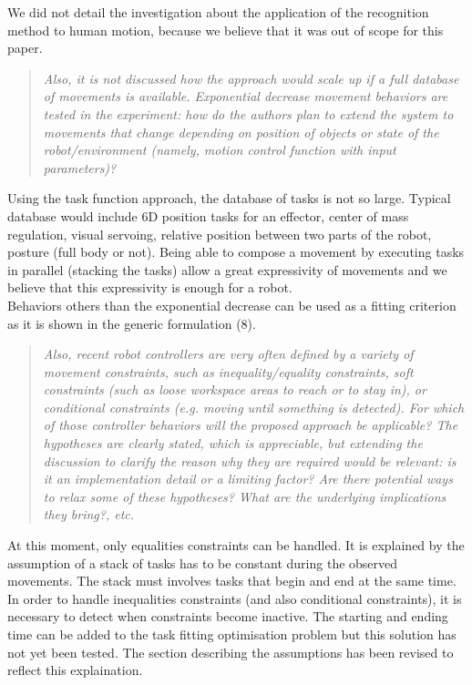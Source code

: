 \documentclass[11pt]{article}
\begin{document}
We did not detail the investigation about the application of the recognition
method to human motion, because we believe that
it was out of scope for this paper.

\begin{quote}
\textit{
Also, it is not discussed how the approach would scale up if a full database of movements is available. Exponential decrease movement behaviors are tested in the experiment: how do the authors plan to extend the system to movements that change depending on position of objects or state of the robot/environment (namely, motion control function with input parameters)?
}
\end{quote}
Using the task function approach,
the database of tasks is not so large. Typical database would include
6D position tasks for an effector, center of mass regulation, 
   visual servoing, relative position between two parts of the robot, 
   posture (full body or not).
  Being able to compose a movement by executing tasks in parallel (stacking the tasks)
  allow a great expressivity of movements and we believe that this expressivity
  is enough for a robot. \\

  Behaviors others than the exponential decrease can be
  used as a fitting criterion as it is shown in the generic formulation (8).

\begin{quote}
\textit{
  Also, recent robot controllers are very often defined by a variety of movement constraints, such as inequality/equality constraints, soft constraints (such as loose workspace areas to reach or to stay in), or conditional constraints (e.g. moving until something is detected). For which of those controller behaviors will the proposed approach be applicable?
  The hypotheses are clearly stated, which is appreciable, but extending the discussion to clarify the reason why they are required would be relevant: is it an implementation detail or a limiting factor? Are there potential ways to relax some of these hypotheses? What are the underlying implications they bring?, etc.
}
\end{quote}
At this moment, only equalities constraints can be handled. It is explained by the assumption of a stack
of tasks has to be constant during the observed movements.
The stack must involves tasks that begin and end at the same time.
In order to handle inequalities constraints (and also conditional constraints), it is necessary to detect
when constraints become inactive. The starting and ending time can be added
to the task fitting optimisation problem but this solution has not yet been tested.
The section describing the assumptions has been revised to reflect this explaination.
\end{document}
